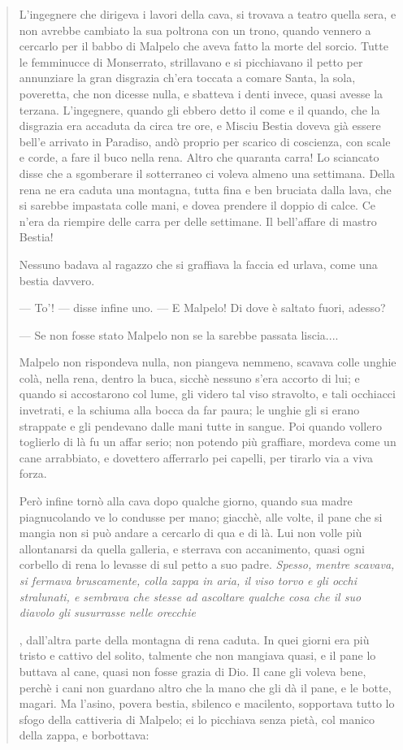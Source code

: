 \documentclass{book}
\newcounter{mar}
\newcommand{\mar}[2]{
\addtocounter{mar}{1}
\hspace{-0.73em}\textsuperscript{\hyperref[\thechapter.\themar]{\themar}}\marginpar{\footnotesize\textbf{\themar}\label{\thechapter.\themar}. #2}\hspace{-0.4em}
}
\newcommand{\mat}[1]{\mar{gg}{#1}}
\begin{document}
\begin{quote}
 L’ingegnere che dirigeva i lavori della cava, si trovava a teatro quella sera, e non avrebbe cambiato la sua poltrona con un trono, quando vennero a cercarlo per il babbo di Malpelo che aveva fatto la morte del sorcio. Tutte le femminucce di Monserrato, strillavano e si picchiavano il petto per annunziare la gran disgrazia ch’era toccata a comare Santa, la sola, poveretta, che non dicesse nulla, e sbatteva i denti invece, quasi avesse la terzana. L’ingegnere, quando gli ebbero detto il come e il quando, che la disgrazia era accaduta da circa tre ore, e Misciu Bestia doveva già essere bell’e arrivato in Paradiso, andò proprio per scarico di coscienza, con scale e corde, a fare il buco nella rena. Altro che quaranta carra! Lo sciancato disse che a sgomberare il sotterraneo ci voleva almeno una settimana. Della rena ne era caduta una montagna, tutta fina e ben bruciata dalla lava, che si sarebbe impastata colle mani, e dovea prendere il doppio di calce. Ce n’era da riempire delle carra per delle settimane. Il bell’affare di mastro Bestia!
 
 Nessuno badava al ragazzo che si graffiava la faccia ed urlava, come una bestia davvero.
 
 — To’! — disse infine uno. — E Malpelo! Di dove è saltato fuori, adesso?
 
 — Se non fosse stato Malpelo non se la sarebbe passata liscia....
 
 Malpelo non rispondeva nulla, non piangeva nemmeno, scavava colle unghie colà, nella rena, dentro la buca, sicchè nessuno s’era accorto di lui; e quando si accostarono col lume, gli videro tal viso stravolto, e tali occhiacci invetrati, e la schiuma alla bocca da far paura; le unghie gli si erano strappate e gli pendevano dalle mani tutte in sangue. Poi quando vollero toglierlo di là fu un affar serio; non potendo più graffiare, mordeva come un cane arrabbiato, e dovettero afferrarlo pei capelli, per tirarlo via a viva forza.
 
 Però infine tornò alla cava dopo qualche giorno, quando sua madre piagnucolando ve lo condusse per mano; giacchè, alle volte, il pane che si mangia non si può andare a cercarlo di qua e di là. Lui non volle più allontanarsi da quella galleria, e sterrava con accanimento, quasi ogni corbello di rena lo levasse di sul petto a suo padre. \textit{Spesso, mentre scavava, si fermava bruscamente, colla zappa in aria, il viso torvo e gli occhi stralunati, e sembrava che stesse ad ascoltare qualche cosa che il suo diavolo gli susurrasse nelle orecchie}\mat{ha ancora speranza che il padre sia vivo}, dall’altra parte della montagna di rena caduta. In quei giorni era più tristo e cattivo del solito, talmente che non mangiava quasi, e il pane lo buttava al cane, quasi non fosse grazia di Dio. Il cane gli voleva bene, perchè i cani non guardano altro che la mano che gli dà il pane, e le botte, magari. Ma l’asino, povera bestia, sbilenco e macilento, sopportava tutto lo sfogo della cattiveria di Malpelo; ei lo picchiava senza pietà, col manico della zappa, e borbottava:
 

\end{quote}
\end{document}
